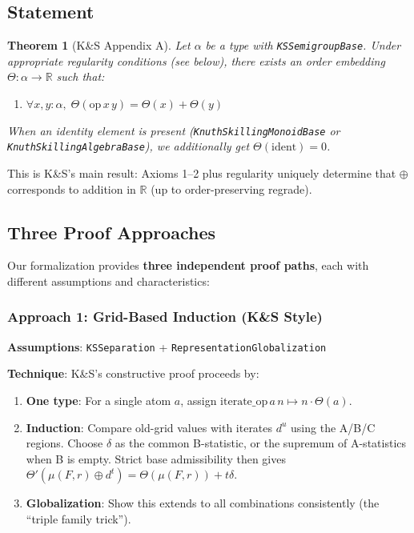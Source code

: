 \documentclass[11pt]{article}
\newtheorem{theorem}{Theorem}[section]
\theoremstyle{definition}
\theoremstyle{remark}
\begin{document}
\subsection{Statement}

\begin{theorem}[K\&S Appendix A]
\label{thm:representation}
Let $\alpha$ be a type with \texttt{KSSemigroupBase}.
Under appropriate regularity conditions (see below), there exists an order embedding $\Theta : \alpha \to \mathbb{R}$ such that:
\begin{enumerate}
\item $\forall x, y : \alpha,\; \Theta(\text{op}\, x\, y) = \Theta(x) + \Theta(y)$
\end{enumerate}
When an identity element is present (\texttt{KnuthSkillingMonoidBase} or \texttt{KnuthSkillingAlgebraBase}), we additionally get $\Theta(\text{ident}) = 0$.
\end{theorem}

This is K\&S's main result: Axioms 1--2 plus regularity uniquely determine that $\oplus$ corresponds to addition in $\mathbb{R}$ (up to order-preserving regrade).

\subsection{Three Proof Approaches}

Our formalization provides \textbf{three independent proof paths}, each with different assumptions and characteristics:

\subsubsection{Approach 1: Grid-Based Induction (K\&S Style)}

\textbf{Assumptions}: \texttt{KSSeparation} + \texttt{RepresentationGlobalization}

\textbf{Technique}: K\&S's constructive proof proceeds by:
\begin{enumerate}
\item \textbf{One type}: For a single atom $a$, assign $\text{iterate\_op}\, a\, n \mapsto n \cdot \Theta(a)$.
\item \textbf{Induction}: Compare old-grid values with iterates $d^u$ using the A/B/C regions.
   Choose $\delta$ as the common B-statistic, or the supremum of A-statistics when B is empty.
   Strict base admissibility then gives $\Theta'(\mu(F,r)\oplus d^t)=\Theta(\mu(F,r))+t\delta$.
\item \textbf{Globalization}: Show this extends to all combinations consistently (the ``triple family trick'').
\end{enumerate}
\end{document}
